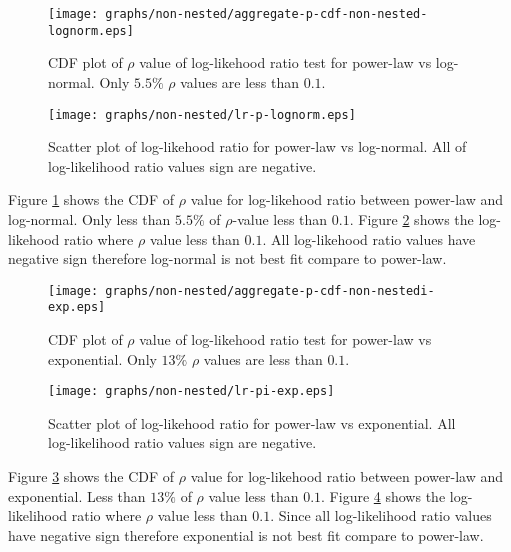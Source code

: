\documentclass[paper]{ieice}
\begin{document}
\begin{figure}[tb]
\begin{center}
\texttt{[image: graphs/non-nested/aggregate-p-cdf-non-nested-lognorm.eps]}
\end{center}
\caption{CDF plot of $\rho$ value of log-likehood ratio test for power-law vs log-normal. Only $5.5\%$ $\rho$ values are less than $0.1$.}
\label{fig:cdf-p-lognorm}
\end{figure}
\begin{figure}[tb]
\begin{center}
\texttt{[image: graphs/non-nested/lr-p-lognorm.eps]}
\end{center}
\caption{Scatter plot of log-likehood ratio for power-law vs log-normal. All of log-likelihood ratio values sign are negative.}
\label{fig:scatter-lognorm}
\end{figure}

Figure \ref{fig:cdf-p-lognorm} shows the CDF of $\rho$ value for log-likehood ratio between power-law and log-normal.  
Only less than $5.5\%$ of $\rho$-value less than $0.1$.   
Figure \ref{fig:scatter-lognorm} shows the log-likehood ratio where $\rho$ value less than $0.1$. 
All log-likehood ratio values have negative sign therefore log-normal is not best fit compare to power-law.

\begin{figure}[tb]
\begin{center}
\texttt{[image: graphs/non-nested/aggregate-p-cdf-non-nestedi-exp.eps]}
\end{center}
\caption{CDF plot of $\rho$ value of log-likehood ratio test for power-law vs exponential. Only $13\%$ $\rho$ values are less than $0.1$.}
\label{fig:cdf-p-exp}
\end{figure}
\begin{figure}[tb]
\begin{center}
\texttt{[image: graphs/non-nested/lr-pi-exp.eps]}
\end{center}
\caption{Scatter plot of log-likehood ratio for power-law vs exponential. All log-likelihood ratio values sign are negative.}
\label{fig:scatter-exp}
\end{figure}

Figure \ref{fig:cdf-p-exp} shows the CDF of $\rho$ value for log-likehood ratio between power-law and exponential. 
Less than $13\%$ of $\rho$ value less than $0.1$.   
Figure \ref{fig:scatter-exp} shows the log-likelihood ratio where $\rho$ value less than $0.1$. 
Since all log-likelihood ratio values have negative sign therefore exponential is not best fit compare to power-law.
\end{document}
